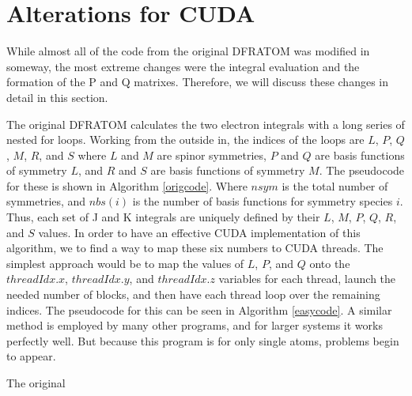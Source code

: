 \documentclass[12pt]{book}
\begin{document}
\section{Alterations for CUDA}
While almost all of the code from the original DFRATOM was modified in someway, the most extreme changes were the integral evaluation and the formation of the P and Q matrixes. Therefore, we will discuss these changes in detail in this section.

The original DFRATOM calculates the two electron integrals with a long series of nested for loops. Working from the outside in, the indices of the loops are $L$, $P$, $Q$, $M$, $R$, and $S$ where $L$ and $M$ are spinor symmetries, $P$ and $Q$ are basis functions of symmetry $L$, and $R$ and $S$ are basis functions of symmetry $M$. The pseudocode for these is shown in Algorithm \ref{origcode}. Where $nsym$ is the total number of symmetries, and $nbs(i)$ is the number of basis functions for symmetry species $i$. Thus, each set of J and K integrals are uniquely defined by their $L$, $M$, $P$, $Q$, $R$, and $S$ values. In order to have an effective CUDA implementation of this algorithm, we to find a way to map these six numbers to CUDA threads. The simplest approach would be to map the values of $L$, $P$, and $Q$ onto the $threadIdx.x$, $threadIdx.y$, and $threadIdx.z$ variables for each thread, launch the needed number of blocks, and then have each thread loop over the remaining indices. The pseudocode for this can be seen in Algorithm \ref{easycode}. A similar method is employed by many other programs, and for larger systems it works perfectly well. But because this program is for only single atoms, problems begin to appear.

\begin{algorithm}
\caption{The original }
\label{origcode}
\begin{algorithmic}
				\ELSE
				\ENDIF
					\ELSE
					\ENDIF
					\ENDFOR
				\ENDFOR
			\ENDFOR
		\ENDFOR
	\ENDFOR
\ENDFOR
\end{algorithmic}
\end{algorithm}
\end{document}
